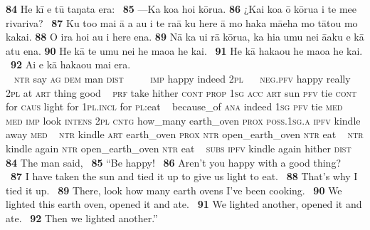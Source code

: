 \bigskip\gll
\textbf{\textup{84}} He kī e tū taŋata era: ~\textbf{\textup{85}} —Ka koa ho{\ꞌ}i kōrua. \textbf{\textup{86}} ¿Kai koa {\ꞌ}ō kōrua {\ꞌ}i te me{\ꞌ}e rivariva? ~\textbf{\textup{87}} Ku to{\ꞌ}o mai {\ꞌ}ā a au i te ra{\ꞌ}ā ku here {\ꞌ}ā mo haka mā{\ꞌ}eha mo tātou mo kakai. \textbf{\textup{88}} {\ꞌ}O ira ho{\ꞌ}i au i here ena. \textbf{\textup{89}} Nā ka u{\ꞌ}i rā kōrua, ka hia {\ꞌ}umu nei {\ꞌ}ā{\ꞌ}aku e kā atu ena. \textbf{\textup{90}} He kā te {\ꞌ}umu nei he ma{\ꞌ}oa he kai. ~\textbf{\textup{91}} He kā haka{\ꞌ}ou he ma{\ꞌ}oa he kai. ~\textbf{\textup{92}} {\ꞌ}Ai e kā haka{\ꞌ}ou mai era.\\
~ \textsc{ntr} say \textsc{ag} \textsc{dem} man \textsc{dist} ~ ~~~\textsc{imp} happy indeed \textsc{2pl}  ~ ~\textsc{neg.pfv} happy really \textsc{2pl} at \textsc{art} thing good ~ \textsc{prf} take hither \textsc{cont} \textsc{prop} \textsc{1sg} \textsc{acc} \textsc{art} sun \textsc{pfv} tie \textsc{cont} for \textsc{caus} light for \textsc{1pl.incl} for \textsc{pl}:eat  ~ because\_of \textsc{ana} indeed \textsc{1sg} \textsc{pfv} tie \textsc{med} ~ \textsc{med} \textsc{imp} look \textsc{intens} \textsc{2pl} \textsc{cntg} how\_many earth\_oven \textsc{prox} \textsc{poss.1sg.a} \textsc{ipfv} kindle away \textsc{med}  ~ \textsc{ntr} kindle \textsc{art} earth\_oven \textsc{prox} \textsc{ntr} open\_earth\_oven \textsc{ntr} eat ~ \textsc{ntr} kindle again \textsc{ntr} open\_earth\_oven \textsc{ntr} eat ~ \textsc{subs} \textsc{ipfv} kindle again hither \textsc{dist}\\

\medskip\glt
\textbf{\textup{84}} The man said, ~\textbf{\textup{85}} “Be happy! ~\textbf{\textup{86}} Aren’t you happy with a good thing? ~ ~\textbf{\textup{87}} I have taken the sun and tied it up to give us light to eat. ~\textbf{\textup{88}} That’s why I tied it up. ~\textbf{\textup{89}} There, look how many earth ovens I’ve been cooking. ~\textbf{\textup{90}} We lighted this earth oven, opened it and ate. ~\textbf{\textup{91}} We lighted another, opened it and ate. ~\textbf{\textup{92}} Then we lighted another.”


~

